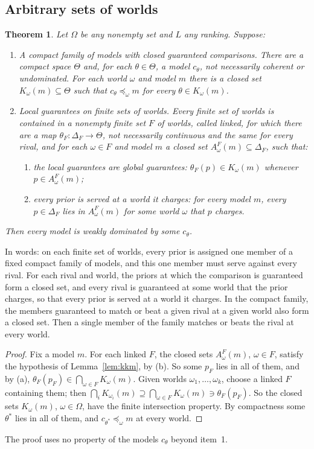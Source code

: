 \documentclass[11pt]{article}
\newtheorem{theorem}{Theorem}[section]
\theoremstyle{definition}
\theoremstyle{remark}
\begin{document}
\subsection{Arbitrary sets of worlds}
\begin{theorem}\label{thm:local}
Let $\Omega$ be any nonempty set and $L$ any ranking. Suppose:
\begin{enumerate}[label=\arabic*.,leftmargin=*]
\item \emph{A compact family of models with closed guaranteed comparisons.} There are a compact space $\Theta$ and, for each $\theta\in\Theta$, a model $c_\theta$, not necessarily coherent or undominated. For each world $\omega$ and model $m$ there is a closed set $K_\omega(m)\subseteq\Theta$ such that $c_\theta\preceq_\omega m$ for every $\theta\in K_\omega(m)$.
\item \emph{Local guarantees on finite sets of worlds.} Every finite set of worlds is contained in a nonempty finite set $F$ of worlds, called \emph{linked}, for which there are a map $\theta_F:\Delta_F\to\Theta$, not necessarily continuous and the same for every rival, and for each $\omega\in F$ and model $m$ a closed set $A^F_\omega(m)\subseteq\Delta_F$, such that:
\begin{enumerate}[label=(\alph*)]
\item the local guarantees are global guarantees: $\theta_F(p)\in K_\omega(m)$ whenever $p\in A^F_\omega(m)$;
\item every prior is served at a world it charges: for every model $m$, every $p\in\Delta_F$ lies in $A^F_\omega(m)$ for some world $\omega$ that $p$ charges.
\end{enumerate}
\end{enumerate}
Then every model is weakly dominated by some $c_\theta$.
\end{theorem}
In words: on each finite set of worlds, every prior is assigned one member of a fixed compact family of models, and this one member must serve against every rival. For each rival and world, the priors at which the comparison is guaranteed form a closed set, and every rival is guaranteed at some world that the prior charges, so that every prior is served at a world it charges. In the compact family, the members guaranteed to match or beat a given rival at a given world also form a closed set. Then a single member of the family matches or beats the rival at every world.
\begin{proof}
Fix a model $m$. For each linked $F$, the closed sets $A^F_\omega(m)$, $\omega\in F$, satisfy the hypothesis of Lemma~\ref{lem:kkm}, by (b). So some $p_F$ lies in all of them, and by (a), $\theta_F(p_F)\in\bigcap_{\omega\in F}K_\omega(m)$. Given worlds $\omega_1,\dots,\omega_k$, choose a linked $F$ containing them; then $\bigcap_iK_{\omega_i}(m)\supseteq\bigcap_{\omega\in F}K_\omega(m)\ni\theta_F(p_F)$. So the closed sets $K_\omega(m)$, $\omega\in\Omega$, have the finite intersection property. By compactness some $\theta^*$ lies in all of them, and $c_{\theta^*}\preceq_\omega m$ at every world.
\end{proof}
The proof uses no property of the models $c_\theta$ beyond item~1.
\end{document}
